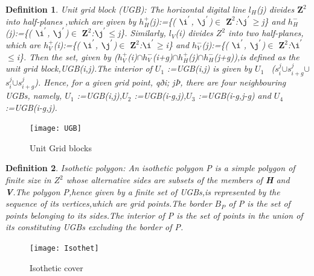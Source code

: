 \documentclass[12pt]{article}
\newtheorem{DEF}{Definition}
\begin{document}
\begin{DEF}
\textnormal{Unit grid block (UGB)}: The horizontal digital line ${\textit{l}}_H$(\textit{j}) divides $\textbf{Z}^2$ into half-planes ,which are given by  \textit{$h_H^{+}$}(\textit{j}):=\{(\textit{ $\i^{'}$},\textit{ $\j^{'}$})$\in$ $\textbf{Z}^2$:\textit{$\j^{'}$}$\geq$\textit{j}\} and  \textit{$h_H^{-}$}(\textit{j}):=\{(\textit{ $\i^{'}$},\textit{ $\j^{'}$})$\in$ $\textbf{Z}^2$:\textit{$\j^{'}$}$\leq$\textit{j}\}. Similarly, ${\textit{l}}_V$(\textit{i}) divides \textbf{$Z^{2}$} into two half-planes, which are \textit{$h_V^{+}$}(\textit{i}):=\{(\textit{ $\i^{'}$},\textit{ $\j^{'}$})$\in$ $\textbf{Z}^2$:\textit{$\i^{'}$}$\geq$\textit{i}\} and  \textit{$h_V^{-}$}(\textit{j}):=\{(\textit{ $\i^{'}$},\textit{ $\j^{'}$})$\in$ $\textbf{Z}^2$:\textit{$\i^{'}$}$\leq$\textit{i}\}. Then the set, given by (\textit{$h_V^{+}$}(\textit{i})$\cap$\textit{$h_V^{-}$}(\textit{i}+\textit{g})$\cap$\textit{$h_H^{+}$}(\textit{j})$\cap$\textit{$h_H^{-}$}(\textit{j}+\textit{g})),is defined as the unit grid block,UGB(\textit{i},\textit{j}).The interior of \textit{$U_{1}$} :=UGB(\textit{i},\textit{j}) is given by \textit{$U_{1}$} \ (\textit{$s_{i}^{j}$}$\cup$\textit{$s_{i+g}^{j}$}$\cup$ \textit{$s_{i}^{j}$}$\cup$\textit{$s_{i+g}^{j}$}). Hence, for a given grid point, qði; jÞ, there are four neighbouring UGBs, namely, \textit{$U_{1}$} :=UGB(\textit{i},\textit{j}),\textit{$U_{2}$} :=UGB(\textit{i-g},\textit{j}),\textit{$U_{3}$} :=UGB(\textit{i-g},\textit{j-g}) and \textit{$U_{4}$} :=UGB(\textit{i-g},\textit{j}).
\end{DEF}
\begin{figure}[H]
	\centering
	\texttt{[image: UGB]}
	\caption{Unit Grid blocks}
	\label{fig:fig_ugb}
\end{figure}

\begin{DEF}
\textnormal{Isothetic polygon}: An isothetic polygon \textit{P} is a simple polygon of finite size in \textbf{$Z^{2}$} whose alternative sides are subsets of the members of \textbf{H} and \textbf{V}.The polygon \textit{P},hence given by a finite set of UGBs,is represented by the sequence of its vertices,which are grid points.The border \textit{$B_{P}$} of \textit{P} is the set of points belonging to its sides.The interior of \textit{P} is the set of points in the union of its constituting UGBs excluding the border of P.
\end{DEF}
\begin{figure}[h]
	\centering
	\texttt{[image: Isothet]}
	\caption{Isothetic cover}
	\label{fig:fig_isocover}
\end{figure}
\end{document}
